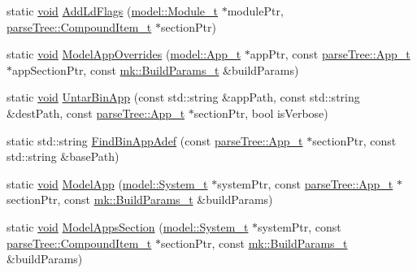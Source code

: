 \begin{DoxyCompactItemize}
\item 
static \hyperlink{_t_e_m_p_l_a_t_e__cdef_8h_ac9c84fa68bbad002983e35ce3663c686}{void} \hyperlink{namespacemodeller_a3434b7a277b1c5159f155a4ecf20cf57}{Add\+Ld\+Flags} (\hyperlink{structmodel_1_1_module__t}{model\+::\+Module\+\_\+t} $\ast$module\+Ptr, \hyperlink{structparse_tree_1_1_compound_item__t}{parse\+Tree\+::\+Compound\+Item\+\_\+t} $\ast$section\+Ptr)
\item 
static \hyperlink{_t_e_m_p_l_a_t_e__cdef_8h_ac9c84fa68bbad002983e35ce3663c686}{void} \hyperlink{namespacemodeller_a00c46a23d7eab8ebed68931d80172c8a}{Model\+App\+Overrides} (\hyperlink{structmodel_1_1_app__t}{model\+::\+App\+\_\+t} $\ast$app\+Ptr, const \hyperlink{structparse_tree_1_1_app__t}{parse\+Tree\+::\+App\+\_\+t} $\ast$app\+Section\+Ptr, const \hyperlink{structmk_1_1_build_params__t}{mk\+::\+Build\+Params\+\_\+t} \&build\+Params)
\item 
static \hyperlink{_t_e_m_p_l_a_t_e__cdef_8h_ac9c84fa68bbad002983e35ce3663c686}{void} \hyperlink{namespacemodeller_ab83ed35583bba834970ffb96a78cb380}{Untar\+Bin\+App} (const std\+::string \&app\+Path, const std\+::string \&dest\+Path, const \hyperlink{structparse_tree_1_1_app__t}{parse\+Tree\+::\+App\+\_\+t} $\ast$section\+Ptr, bool is\+Verbose)
\item 
static std\+::string \hyperlink{namespacemodeller_aceb65321fe14c17bf359621f009196db}{Find\+Bin\+App\+Adef} (const \hyperlink{structparse_tree_1_1_app__t}{parse\+Tree\+::\+App\+\_\+t} $\ast$section\+Ptr, const std\+::string \&base\+Path)
\item 
static \hyperlink{_t_e_m_p_l_a_t_e__cdef_8h_ac9c84fa68bbad002983e35ce3663c686}{void} \hyperlink{namespacemodeller_a69ee315e9080bc046cb14a4d3b5ee9f6}{Model\+App} (\hyperlink{structmodel_1_1_system__t}{model\+::\+System\+\_\+t} $\ast$system\+Ptr, const \hyperlink{structparse_tree_1_1_app__t}{parse\+Tree\+::\+App\+\_\+t} $\ast$section\+Ptr, const \hyperlink{structmk_1_1_build_params__t}{mk\+::\+Build\+Params\+\_\+t} \&build\+Params)
\item 
static \hyperlink{_t_e_m_p_l_a_t_e__cdef_8h_ac9c84fa68bbad002983e35ce3663c686}{void} \hyperlink{namespacemodeller_a81df1b6bec9baedd971a2462c77ae264}{Model\+Apps\+Section} (\hyperlink{structmodel_1_1_system__t}{model\+::\+System\+\_\+t} $\ast$system\+Ptr, const \hyperlink{structparse_tree_1_1_compound_item__t}{parse\+Tree\+::\+Compound\+Item\+\_\+t} $\ast$section\+Ptr, const \hyperlink{structmk_1_1_build_params__t}{mk\+::\+Build\+Params\+\_\+t} \&build\+Params)
\item 

\end{DoxyCompactItemize}
